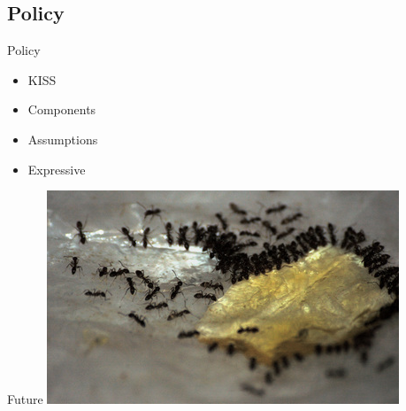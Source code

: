 \subsection{Policy}

\begin{frame}{Policy}
\begin{itemize}
\item KISS
\item Components
\item Assumptions
\item Expressive
\end{itemize}
\end{frame}

\begin{frame}{Future}
  \includegraphics{ants.jpg}
\end{frame}




